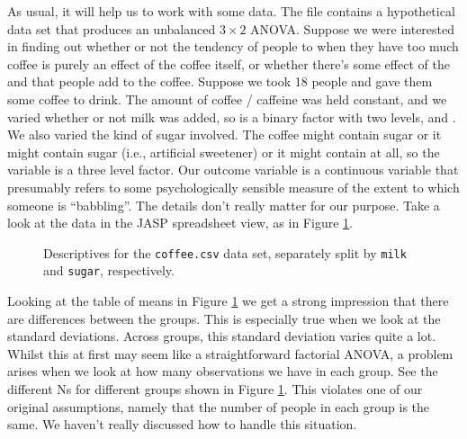 As usual, it will help us to work with some data. The  file contains a hypothetical data set that produces an unbalanced $3 \times 2$ ANOVA. Suppose we were interested in finding out whether or not the tendency of people to  when they have too much coffee is purely an effect of the coffee itself, or whether there's some effect of the  and  that people add to the coffee. Suppose we took 18 people and gave them some coffee to drink. The amount of coffee / caffeine was held constant, and we varied whether or not milk was added, so  is a binary factor with two levels,  and . We also varied the kind of sugar involved. The coffee might contain  sugar or it might contain  sugar (i.e., artificial sweetener) or it might contain  at all, so the  variable is a three level factor. Our outcome variable is a continuous variable that presumably refers to some psychologically sensible measure of the extent to which someone is ``babbling''. The details don't really matter for our purpose. Take a look at the data in the JASP spreadsheet view, as in Figure \ref{fig:factorialanova15}.

\vspace{0.5cm}
\begin{figure}[!htb]
\begin{center}
\caption{Descriptives for the \texttt{coffee.csv} data set, separately split by \texttt{milk} and \texttt{sugar}, respectively.}
\label{fig:factorialanova15}
\HR
\end{center}
\end{figure}

Looking at the table of means in Figure \ref{fig:factorialanova15} we get a strong impression that there are differences between the groups. This is especially true when we look at the standard deviations. Across groups, this standard deviation varies quite a lot. Whilst this at first may seem like a straightforward factorial ANOVA, a problem arises when we look at how many observations we have in each group. See the different Ns for different groups shown in Figure \ref{fig:factorialanova15}. This violates one of our original assumptions, namely that the number of people in each group is the same. We haven't really discussed how to handle this situation.


